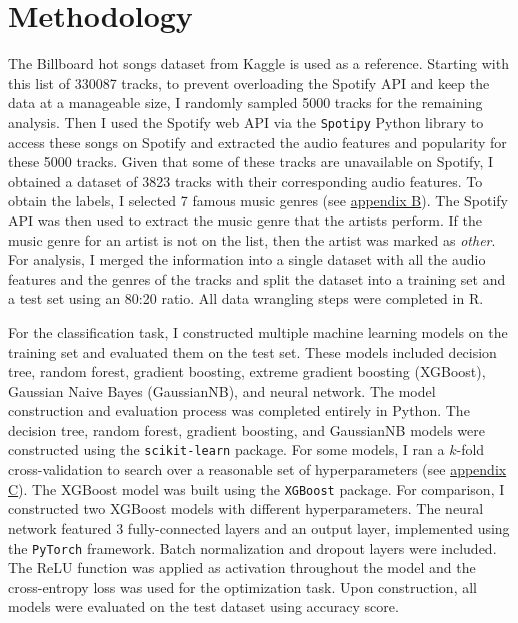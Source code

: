 \documentclass{article}
\begin{document}
\section{Methodology}

The Billboard hot songs dataset from Kaggle is used as a reference. Starting with this list of 330087 tracks, to prevent overloading the Spotify API and keep the data at a manageable size, I randomly sampled 5000 tracks for the remaining analysis. Then I used the Spotify web API via the \texttt{Spotipy} Python library to access these songs on Spotify and extracted the audio features and popularity for these 5000 tracks. Given that some of these tracks are unavailable on Spotify, I obtained a dataset of 3823 tracks with their corresponding audio features. To obtain the labels, I selected 7 famous music genres (see \hyperref[sec:select_music_genres]{appendix B}). The Spotify API was then used to extract the music genre that the artists perform. If the music genre for an artist is not on the list, then the artist was marked as \textit{other}. For analysis, I merged the information into a single dataset with all the audio features and the genres of the tracks and split the dataset into a training set and a test set using an 80:20 ratio. All data wrangling steps were completed in R.

For the classification task, I constructed multiple machine learning models on the training set and evaluated them on the test set. These models included decision tree, random forest, gradient boosting, extreme gradient boosting (XGBoost), Gaussian Naive Bayes (GaussianNB), and neural network. The model construction and evaluation process was completed entirely in Python. The decision tree, random forest, gradient boosting, and GaussianNB models were constructed using the \texttt{scikit-learn} package. For some models, I ran a \(k\)-fold cross-validation to search over a reasonable set of hyperparameters (see \hyperref[sec:hyperparameters]{appendix C}). The XGBoost model was built using the \texttt{XGBoost} package. For comparison, I constructed two XGBoost models with different hyperparameters. The neural network featured 3 fully-connected layers and an output layer, implemented using the \texttt{PyTorch} framework. Batch normalization and dropout layers were included. The ReLU function was applied as activation throughout the model and the cross-entropy loss was used for the optimization task. Upon construction, all models were evaluated on the test dataset using accuracy score.
\end{document}
